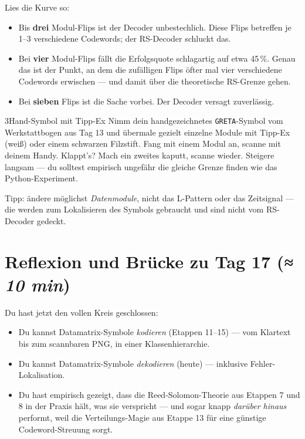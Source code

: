 Lies die Kurve so:

\begin{itemize}
\item Bis \textbf{drei} Modul-Flips ist der Decoder unbestechlich.
  Diese Flips betreffen je 1--3 verschiedene Codewords; der
  RS-Decoder schluckt das.
\item Bei \textbf{vier} Modul-Flips fällt die Erfolgsquote schlag­artig
  auf etwa 45\,\%. Genau das ist der Punkt, an dem die zufälligen
  Flips öfter mal vier verschiedene Codewords erwischen — und damit
  über die theoretische RS-Grenze gehen.
\item Bei \textbf{sieben} Flips ist die Sache vorbei. Der Decoder
  versagt zuverlässig.
\end{itemize}

\begin{bleistiftuebung}{3}{Hand-Symbol mit Tipp-Ex}
Nimm dein hand­gezeichnetes \texttt{GRETA}-Symbol vom Werkstattbogen
aus Tag 13 und übermale gezielt einzelne Module mit Tipp-Ex (weiß)
oder einem schwarzen Filzstift. Fang mit einem Modul an, scanne mit
deinem Handy. Klappt's? Mach ein zweites kaputt, scanne wieder.
Steigere langsam — du solltest empirisch ungefähr die gleiche
Grenze finden wie das Python-Experiment.

Tipp: ändere möglichst \emph{Datenmodule}, nicht das L-Pattern oder
das Zeitsignal — die werden zum Lokalisieren des Symbols gebraucht
und sind nicht vom RS-Decoder gedeckt.
\end{bleistiftuebung}

\section{Reflexion und Brücke zu Tag 17 \normalfont(\textit{≈ 10 min})}

Du hast jetzt den vollen Kreis geschlossen:

\begin{itemize}
\item Du kannst Datamatrix-Symbole \emph{kodieren} (Etappen 11--15)
  — vom Klartext bis zum scannbaren PNG, in einer Klassenhierarchie.
\item Du kannst Datamatrix-Symbole \emph{dekodieren} (heute) —
  inklusive Fehler-Lokalisation.
\item Du hast empirisch gezeigt, dass die Reed-Solomon-Theorie aus
  Etappen 7 und 8 in der Praxis hält, was sie verspricht — und sogar
  knapp \emph{darüber hinaus} performt, weil die Verteilungs-Magie
  aus Etappe 13 für eine günstige Codeword-Streuung sorgt.
\end{itemize}

